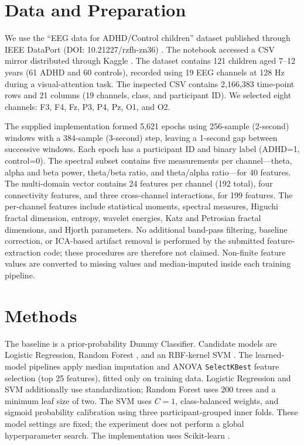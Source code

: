 \documentclass{article}
\begin{document}
\section{Data and Preparation}
We use the ``EEG data for ADHD/Control children'' dataset published through IEEE DataPort (DOI: 10.21227/rzfh-zn36) \citep{nasrabadi2020}. The notebook accessed a CSV mirror distributed through Kaggle \citep{kagglemirror}. The dataset contains 121 children aged 7--12 years (61 ADHD and 60 controls), recorded using 19 EEG channels at 128 Hz during a visual-attention task. The inspected CSV contains 2,166,383 time-point rows and 21 columns (19 channels, class, and participant ID). We selected eight channels: F3, F4, Fz, P3, P4, Pz, O1, and O2.

The supplied implementation formed 5,621 epochs using 256-sample (2-second) windows with a 384-sample (3-second) step, leaving a 1-second gap between successive windows. Each epoch has a participant ID and binary label (ADHD=1, control=0). The spectral subset contains five measurements per channel---theta, alpha and beta power, theta/beta ratio, and theta/alpha ratio---for 40 features. The multi-domain vector contains 24 features per channel (192 total), four connectivity features, and three cross-channel interactions, for 199 features. The per-channel features include statistical moments, spectral measures, Higuchi fractal dimension, entropy, wavelet energies, Katz and Petrosian fractal dimensions, and Hjorth parameters. No additional band-pass filtering, baseline correction, or ICA-based artifact removal is performed by the submitted feature-extraction code; these procedures are therefore not claimed. Non-finite feature values are converted to missing values and median-imputed inside each training pipeline.

\section{Methods}
The baseline is a prior-probability Dummy Classifier. Candidate models are Logistic Regression, Random Forest \citep{breiman2001}, and an RBF-kernel SVM \citep{cortes1995}. The learned-model pipelines apply median imputation and ANOVA \texttt{SelectKBest} feature selection (top 25 features), fitted only on training data. Logistic Regression and SVM additionally use standardization; Random Forest uses 200 trees and a minimum leaf size of two. The SVM uses $C=1$, class-balanced weights, and sigmoid probability calibration using three participant-grouped inner folds. These model settings are fixed; the experiment does not perform a global hyperparameter search. The implementation uses Scikit-learn \citep{pedregosa2011}.
\end{document}
